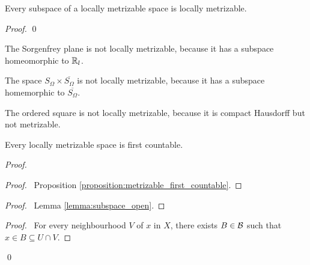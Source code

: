 \begin{proposition}
    Every subspace of a locally metrizable space is locally metrizable.
\end{proposition}

\begin{proof}
    \pf
    \qed
\end{proof}

\begin{corollary}
    The Sorgenfrey plane is not locally metrizable, because it has a subspace homeomorphic to $\mathbb{R}_l$.
\end{corollary}

\begin{example}
    The space $S_\Omega \times \overline{S_\Omega}$ is not locally metrizable, because it has a subspace homemorphic to
    $\overline{S_\Omega}$.    
\end{example}

\begin{example}
    The ordered square is not locally metrizable, because it is compact Hausdorff but not metrizable.
\end{example}

\begin{proposition}
    Every locally metrizable space is first countable.
\end{proposition}

\begin{proof}
    \pf
    \begin{proof}
        \pf\ Proposition \ref{proposition:metrizable_first_countable}.
    \end{proof}
    \begin{proof}
        \pf\ Lemma \ref{lemma:subspace_open}.
    \end{proof}
    \begin{proof}
        \pf\ For every neighbourhood $V$ of $x$ in $X$, there exists $B \in \mathcal{B}$
        such that $x \in B \subseteq U \cap V$.
    \end{proof}
    \qed
\end{proof}

